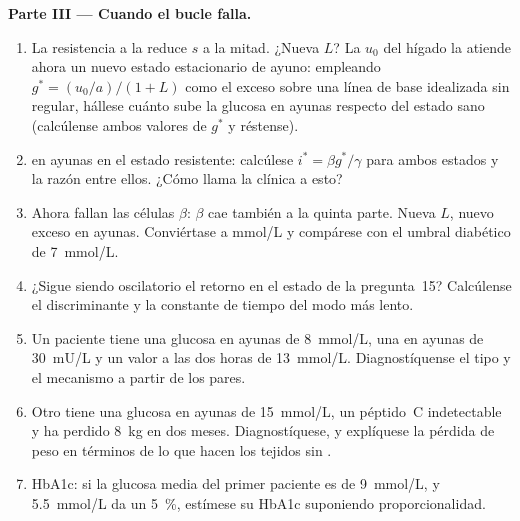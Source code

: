 \begin{problem}
\medskip
\noindent\textbf{Parte III --- Cuando el bucle falla.}
\begin{enumerate}[resume]
  \item La resistencia a la  reduce $s$ a la mitad. ¿Nueva $L$?
        La $u_{0}$ del hígado la atiende ahora un nuevo estado
        estacionario de ayuno: empleando $g^{*} = (u_{0}/a)/(1
        + L)$ como el exceso sobre una línea de base idealizada sin
        regular, hállese cuánto sube la glucosa en ayunas respecto del
        estado sano (calcúlense ambos valores de $g^{*}$ y réstense).
  \item {} en ayunas en el estado resistente: calcúlese $i^{*} = \beta
        g^{*}/\gamma$ para ambos estados y la razón entre ellos. ¿Cómo
        llama la clínica a esto?
  \item Ahora fallan las células $\beta$: $\beta$ cae también a la
        quinta parte. Nueva $L$, nuevo exceso en ayunas. Conviértase a
        mmol/L y compárese con el umbral diabético de \qty{7}{mmol/L}.
  \item ¿Sigue siendo oscilatorio el retorno en el estado de la
        pregunta~15? Calcúlense el discriminante y la constante de
        tiempo del modo más lento.
  \item Un paciente tiene una glucosa en ayunas de \qty{8}{mmol/L}, una
         en ayunas de \qty{30}{mU/L} y un valor a las dos horas
        de \qty{13}{mmol/L}. Diagnostíquense el tipo y el mecanismo a
        partir de los pares.
  \item Otro tiene una glucosa en ayunas de \qty{15}{mmol/L}, un
        péptido~C indetectable y ha perdido \qty{8}{kg} en dos meses.
        Diagnostíquese, y explíquese la pérdida de peso en términos de
        lo que hacen los tejidos sin .
  \item HbA1c: si la glucosa media del primer paciente es de
        \qty{9}{mmol/L}, y \qty{5.5}{mmol/L} da un \qty{5}{\%}, estímese
        su HbA1c suponiendo proporcionalidad.
\end{enumerate}


\end{problem}
